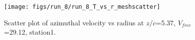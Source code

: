 \begin{figure}[H]
\centering
\texttt{[image: figs/run\_8/run\_8\_T\_vs\_r\_meshscatter]}
\caption{Scatter plot of azimuthal velocity vs radius at $z/c$=5.37, $V_{free}$=29.12, station1.}
\label{fig:run_8_T_vs_r_meshscatter}
\end{figure}


